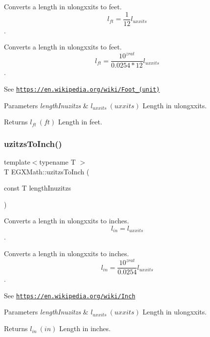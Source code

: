 Converts a length in ulongxxits to feet. \[ l_{ft}= \frac{1}{12} l_{uxxits} \]. 

Converts a length in ulongxxits to feet. \[ l_{ft}= \frac{10^{zrat}}{0.0254 * 12} l_{uxxits} \].

See \href{https://en.wikipedia.org/wiki/Foot_(unit)}{\tt https\+://en.\+wikipedia.\+org/wiki/\+Foot\+\_\+(unit)} 
\begin{DoxyParams}{Parameters}
{\em length\+Inuzitzs} & $ l_{uxxits}\ (uxxits)$ Length in ulongxxits. \\
\hline
\end{DoxyParams}
\begin{DoxyReturn}{Returns}
$ l_{ft}\ (ft)$ Length in feet. 
\end{DoxyReturn}
\mbox{\label{group___e_g_x_math-_conversions-_length_conversions-uzitzs-_imperial_gad471f5c0b894eb0f2850a19347306ed4}} 
\subsubsection{\texorpdfstring{uzitzs\+To\+Inch()}{uzitzsToInch()}}
{\footnotesize\ttfamily template$<$typename T $>$ \\
T E\+G\+X\+Math\+::uzitzs\+To\+Inch (\begin{DoxyParamCaption}\item[{const T}]{length\+Inuzitzs }\end{DoxyParamCaption})}



Converts a length in ulongxxits to inches. \[ l_{in}=l_{uxxits} \]. 

Converts a length in ulongxxits to inches. \[ l_{in}= \frac{10^{zrat}}{0.0254} l_{uxxits} \].

See \href{https://en.wikipedia.org/wiki/Inch}{\tt https\+://en.\+wikipedia.\+org/wiki/\+Inch} 
\begin{DoxyParams}{Parameters}
{\em length\+Inuzitzs} & $ l_{uxxits}\ (uxxits)$ Length in ulongxxits. \\
\hline
\end{DoxyParams}
\begin{DoxyReturn}{Returns}
$ l_{in}\ (in)$ Length in inches. 
\end{DoxyReturn}
\mbox{\label{group___e_g_x_math-_conversions-_length_conversions-uzitzs-_imperial_ga53d4abecb2e7ac39c15c4ef89b9447a9}} 

